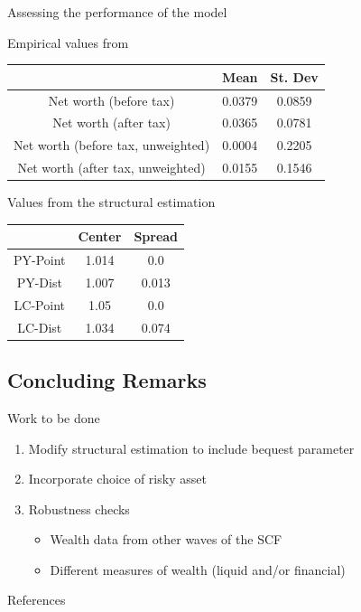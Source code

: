 \documentclass{beamer}
\begin{document}

\begin{frame}{Assessing the performance of the model}
\centering

\begin{flushleft}
\par Empirical values from \cite{aflgdmlp20}
\end{flushleft}
    \begin{tabular}{|c|c|c|}
\hline
& Mean & St. Dev \\
\hline
Net worth (before tax) & 0.0379 & 0.0859  \\
Net worth (after tax) & 0.0365 & 0.0781  \\
Net worth (before tax, unweighted) & 0.0004 & 0.2205  \\
Net worth (after tax, unweighted) & 0.0155 & 0.1546  \\
\hline
\end{tabular}
    
\begin{flushleft}
\par Values from the structural estimation
\end{flushleft}
    \begin{tabular}{|c|c|c|}
\hline
& Center & Spread \\
\hline
PY-Point & 1.014 & 0.0  \\
PY-Dist & 1.007  &  0.013  \\
LC-Point & 1.05 & 0.0  \\
LC-Dist & 1.034  &  0.074  \\
\hline
\end{tabular}

\end{frame}

\subsection{Concluding Remarks}

\begin{frame}{Work to be done}
       
       \begin{enumerate}
       \item Modify structural estimation to include bequest parameter
       \item Incorporate choice of risky asset
       \item Robustness checks
       \begin{itemize}
      \item Wealth data from other waves of the SCF
      \item Different measures of wealth (liquid and/or financial)
      \end{itemize}
      \end{enumerate}
  
\end{frame}


\begin{frame}[allowframebreaks]{References}
  \printbibliography
\end{frame}
\end{document}
